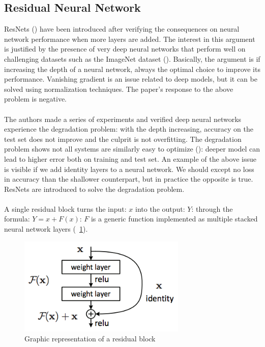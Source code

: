 \documentclass[LaM,binding=0.6cm]{sapthesis}
\begin{document}
\subsection{Residual Neural Network}
ResNets (\cite{DBLP:journals/corr/HeZRS15}) have been introduced after verifying the consequences on neural network performance when more layers are added. The interest in this argument is justified by the presence of very deep neural networks that perform well on challenging datasets such as the ImageNet dataset (\cite{Simonyan14verydeep}). Basically, the argument is if increasing the depth of a neural network, always the optimal choice to improve its performance. Vanishing gradient is an issue related to deep models, but it can be solved using normalization techniques. The paper's response to the above problem is negative.\\\\The authors made a series of experiments and verified deep neural networks experience the degradation problem: with the depth increasing, accuracy on the test set does not improve and the culprit is not overfitting. The degradation problem shows not all systems are similarly easy to optimize (\cite{DBLP:journals/corr/HeZRS15}): deeper model can lead to higher error both on training and test set. An example of the above issue is visible if we add identity layers to a neural network. We should except no loss in accuracy than the shallower counterpart, but in practice the opposite is true. ResNets are introduced to solve the degradation problem.\\\\A single residual block turns the input: $x$ into the output: $Y$: through the formula: $Y = x +F(x)$: $F$ is a generic function implemented as multiple stacked neural network layers (~\ref{fig:resnetfunc}).
\begin{figure}   \centering
    \includegraphics[width=80mm,scale=0.7]{resnetfun.png}
    \caption{Graphic representation of a residual block}
    \label{fig:resnetfunc}
\end{figure}
\end{document}
